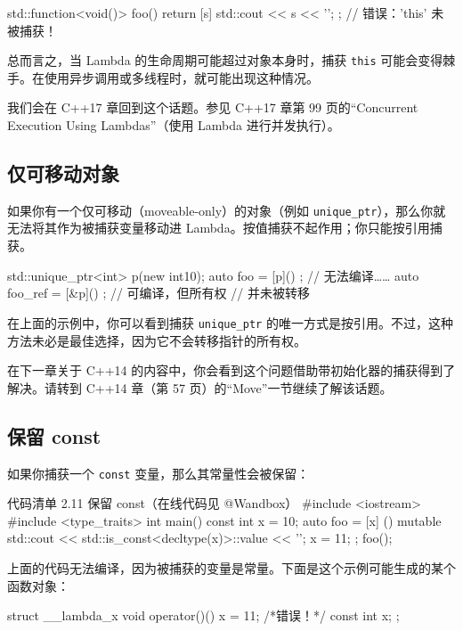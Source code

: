 \begin{codebox}
\begin{codebox}
std::function<void()> foo() {
return [s] { std::cout << s << '\n'; };
} // 错误：'this' 未被捕获！
\end{codebox}

总而言之，当 Lambda 的生命周期可能超过对象本身时，捕获 \texttt{this} 可能会变得棘手。在使用异步调用或多线程时，就可能出现这种情况。

我们会在 C++17 章回到这个话题。参见 C++17 章第 99 页的“Concurrent Execution Using Lambdas”（使用 Lambda 进行并发执行）。

\subsection{仅可移动对象}

如果你有一个仅可移动（moveable-only）的对象（例如 \texttt{unique\_ptr}），那么你就无法将其作为被捕获变量移动进 Lambda。按值捕获不起作用；你只能按引用捕获。

\begin{codebox}
std::unique_ptr<int> p(new int{10});
auto foo = [p]() {};
// 无法编译……
auto foo_ref = [&p]() { }; // 可编译，但所有权
// 并未被转移
\end{codebox}

在上面的示例中，你可以看到捕获 \texttt{unique\_ptr} 的唯一方式是按引用。不过，这种方法未必是最佳选择，因为它不会转移指针的所有权。

在下一章关于 C++14 的内容中，你会看到这个问题借助带初始化器的捕获得到了解决。请转到 C++14 章（第 57 页）的“Move”一节继续了解该话题。

\subsection{保留 const}

如果你捕获一个 \texttt{const} 变量，那么其常量性会被保留：

\begin{codeboxt}{代码清单 2.11 保留 const（在线代码见 @Wandbox）}
#include <iostream>
#include <type_traits>
int main() {
const int x = 10;
auto foo = [x] () mutable {
std::cout << std::is_const<decltype(x)>::value << '\n';
x = 11;
};
foo();
}
\end{codeboxt}

上面的代码无法编译，因为被捕获的变量是常量。下面是这个示例可能生成的某个函数对象：

\begin{codebox}
struct __lambda_x {
void operator()() { x = 11; /*错误！*/ }
const int x;
};
\end{codebox}


\end{codebox}
